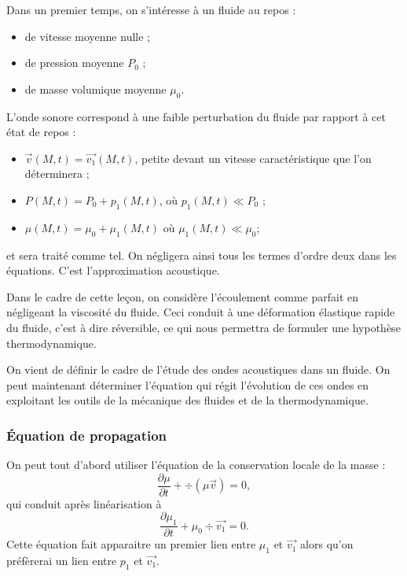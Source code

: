 Dans un premier temps, on s'intéresse à un fluide au repos :
\begin{itemize}
\item de vitesse moyenne nulle ;
\item de pression moyenne $P_0$ ;
\item de masse volumique moyenne $\mu_0$.
\end{itemize}

L'onde sonore correspond à une faible perturbation du fluide par rapport à cet état de repos :
\begin{itemize}
\item $\overrightarrow{v}(M, t) = \overrightarrow{v_1}(M, t)$, petite devant un vitesse caractéristique que l'on déterminera ;
\item $P(M, t) = P_0 + p_1(M, t)$, où $p_1(M, t) \ll P_0$ ;
\item $\mu(M, t) = \mu_0 + \mu_1(M,t)$ où $\mu_1(M, t) \ll \mu_0$;
\end{itemize}
et sera traité comme tel.
On négligera ainsi tous les termes d'ordre deux dans les équations.
C'est l'approximation acoustique.

Dans le cadre de cette leçon, on considère l'écoulement comme parfait en négligeant la viscosité du fluide.
Ceci conduit à une déformation élastique rapide du fluide, c'est à dire réversible, ce qui nous permettra de formuler une hypothèse thermodynamique.

\begin{transition}
On vient de définir le cadre de l'étude des ondes acoustiques dans un fluide.
On peut maintenant déterminer l'équation qui régit l'évolution de ces ondes en exploitant les outils de la mécanique des fluides et de la thermodynamique.
\end{transition}

\subsubsection{Équation de propagation}

On peut tout d'abord utiliser l'équation de la conservation locale de la masse :
\begin{equation*}
\frac{\partial \mu}{\partial t} + \div(\mu\overrightarrow{v}) = 0,
\end{equation*}
qui conduit après linéarisation à
\begin{equation*}
\frac{\partial \mu_1}{\partial t} + \mu_0\div\overrightarrow{v_1} = 0.
\end{equation*}
Cette équation fait apparaitre un premier lien entre $\mu_1$ et $\overrightarrow{v_1}$ alors qu'on préfèrerai un lien entre $p_1$ et $\overrightarrow{v_1}$.

